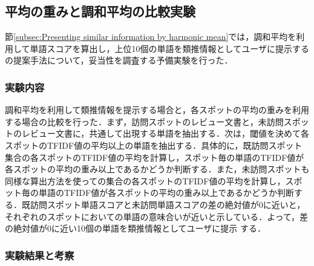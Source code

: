 \documentclass{deimj}
\begin{document}
\subsection{平均の重みと調和平均の比較実験}
\label{subsec:A comparative experiment of harmonic mean over the average weight}

節\ref{subsec:Presenting similar information by harmonic mean}では，調和平均を利用して単語スコアを算出し，上位10個の単語を類推情報としてユーザに提示するの提案手法について，妥当性を調査する予備実験を行った．

\subsubsection{実験内容}
調和平均を利用して類推情報を提示する場合と，各スポットの平均の重みを利用する場合の比較を行った．まず，訪問スポットのレビュー文書と，未訪問スポットのレビュー文書に，共通して出現する単語を抽出する．次は，閾値を決めて各スポットのTFIDF値の平均以上の単語を抽出する．具体的に，既訪問スポット集合の各スポットのTFIDF値の平均を計算し，スポット毎の単語のTFIDF値が各スポットの平均の重み以上であるかどうか判断する．また，未訪問スポットも同様な算出方法を使っての集合の各スポットのTFIDF値の平均を計算し，スポット毎の単語のTFIDF値が各スポットの平均の重み以上であるかどうか判断する．既訪問スポット単語スコアと未訪問単語スコアの差の絶対値が0に近いと，それぞれのスポットにおいての単語の意味合いが近いと示している．よって，差の絶対値が0に近い10個の単語を類推情報としてユーザに提示
する．

\subsubsection{実験結果と考察}


\end{document}
